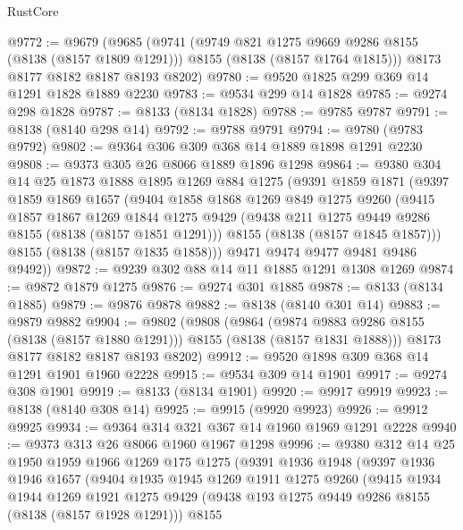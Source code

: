 \begin{lexlean}{RustCore}
\begin{coremodule}
@9772 := @9679
    (@9685
      (@9741
        (@9749 @821 @1275 @9669 @9286 @8155 (@8138 (@8157 @1809 @1291)))
        @8155
        (@8138 (@8157 @1764 @1815)))
      @8173
      @8177
      @8182
      @8187
      @8193
      @8202)
@9780 := @9520 @1825 @299 @369 @14 @1291 @1828 @1889 @2230
@9783 := @9534 @299 @14 @1828
@9785 := @9274 @298 @1828
@9787 := @8133 (@8134 @1828)
@9788 := @9785 @9787
@9791 := @8138 (@8140 @298 @14)
@9792 := @9788 @9791
@9794 := @9780 (@9783 @9792)
@9802 := @9364 @306 @309 @368 @14 @1889 @1898 @1291 @2230
@9808 := @9373 @305 @26 @8066 @1889 @1896 @1298
@9864 := @9380
    @304
    @14
    @25
    @1873
    @1888
    @1895
    @1269
    @884
    @1275
    (@9391
      @1859
      @1871
      (@9397
        @1859
        @1869
        @1657
        (@9404
          @1858
          @1868
          @1269
          @849
          @1275
          @9260
          (@9415
            @1857
            @1867
            @1269
            @1844
            @1275
            @9429
            (@9438 @211 @1275 @9449 @9286 @8155 (@8138 (@8157 @1851 @1291)))
            @8155
            (@8138 (@8157 @1845 @1857)))
          @8155
          (@8138 (@8157 @1835 @1858)))
        @9471
        @9474
        @9477
        @9481
        @9486
        @9492))
@9872 := @9239 @302 @88 @14 @11 @1885 @1291 @1308 @1269
@9874 := @9872 @1879 @1275
@9876 := @9274 @301 @1885
@9878 := @8133 (@8134 @1885)
@9879 := @9876 @9878
@9882 := @8138 (@8140 @301 @14)
@9883 := @9879 @9882
@9904 := @9802
    (@9808
      (@9864
        (@9874 @9883 @9286 @8155 (@8138 (@8157 @1880 @1291)))
        @8155
        (@8138 (@8157 @1831 @1888)))
      @8173
      @8177
      @8182
      @8187
      @8193
      @8202)
@9912 := @9520 @1898 @309 @368 @14 @1291 @1901 @1960 @2228
@9915 := @9534 @309 @14 @1901
@9917 := @9274 @308 @1901
@9919 := @8133 (@8134 @1901)
@9920 := @9917 @9919
@9923 := @8138 (@8140 @308 @14)
@9925 := @9915 (@9920 @9923)
@9926 := @9912 @9925
@9934 := @9364 @314 @321 @367 @14 @1960 @1969 @1291 @2228
@9940 := @9373 @313 @26 @8066 @1960 @1967 @1298
@9996 := @9380
    @312
    @14
    @25
    @1950
    @1959
    @1966
    @1269
    @175
    @1275
    (@9391
      @1936
      @1948
      (@9397
        @1936
        @1946
        @1657
        (@9404
          @1935
          @1945
          @1269
          @1911
          @1275
          @9260
          (@9415
            @1934
            @1944
            @1269
            @1921
            @1275
            @9429
            (@9438 @193 @1275 @9449 @9286 @8155 (@8138 (@8157 @1928 @1291)))
            @8155

\end{coremodule}
\end{lexlean}
